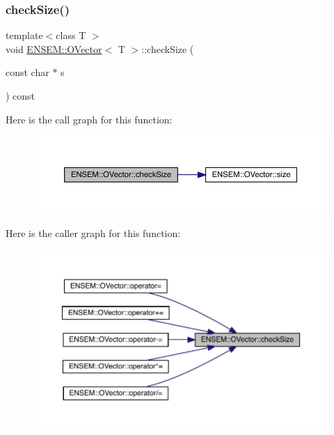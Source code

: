 \subsubsection{\texorpdfstring{checkSize()}{checkSize()}\hspace{0.1cm}{\footnotesize\ttfamily [2/6]}}
{\footnotesize\ttfamily template$<$class T $>$ \\
void \mbox{\hyperlink{classENSEM_1_1OVector}{E\+N\+S\+E\+M\+::\+O\+Vector}}$<$ T $>$\+::check\+Size (\begin{DoxyParamCaption}\item[{const char $\ast$}]{s }\end{DoxyParamCaption}) const\hspace{0.3cm}{\ttfamily [inline]}}

Here is the call graph for this function\+:
\nopagebreak
\begin{figure}[H]
\begin{center}
\leavevmode
\includegraphics[width=350pt]{d0/d8d/classENSEM_1_1OVector_a12d09a71bb2808a7404578da9ba41c4f_cgraph}
\end{center}
\end{figure}
Here is the caller graph for this function\+:
\nopagebreak
\begin{figure}[H]
\begin{center}
\leavevmode
\includegraphics[width=350pt]{d0/d8d/classENSEM_1_1OVector_a12d09a71bb2808a7404578da9ba41c4f_icgraph}
\end{center}
\end{figure}
\mbox{\label{classENSEM_1_1OVector_a12d09a71bb2808a7404578da9ba41c4f}} 
